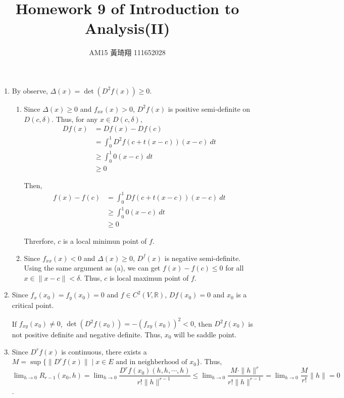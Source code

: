 \documentclass[12pt]{article}
\title{Homework 9 of Introduction to Analysis(II)}
\author{AM15 黃琦翔 111652028}
\begin{document}
\maketitle
\begin{enumerate}
    \item By observe, $\Delta(x) = \det(D^2f(x))\geq 0$.
    \begin{enumerate}
        \item Since $\Delta(x) \geq 0$ and $f_{xx}(x) > 0$, $D^2f(x)$ is positive semi-definite on $D(c, \delta)$.
        Thus, for any $x \in D(c, \delta)$, \begin{align*}
            Df(x) &= Df(x) - Df(c)\\
            &= \int_{0}^{1} D^2f(c+t(x-c))(x-c)\ dt\\
            &\geq \int_{0}^{1} 0(x-c)\ dt\\
            &\geq 0
        \end{align*}
        
        Then, \begin{align*}
            f(x) - f(c) &= \int_{0}^1 Df(c + t(x-c))(x-c)\ dt\\
            &\geq \int_{0}^{1} 0(x-c)\ dt\\
            &\geq 0
        \end{align*}

        Threrfore, $c$ is a local minimun point of $f$. 

        \item Since $f_{xx}(x) < 0$ and $\Delta(x) \geq 0$, $D^f(x)$ is negative semi-definite.
        Using the same argument as (a), we can get $f(x) - f(c) \leq 0$ for all $x\in \| x-c\| < \delta$.
        Thus, $c$ is local maximun point of $f$.

    \end{enumerate}

    \newpage
    \item Since $f_x(x_0) = f_y(x_0) = 0$ and $f \in C^2(V, \mathbb{R})$, $Df(x_0) = 0$ and $x_0$ is a critical point.
    
    If $f_{xy}(x_0)\neq 0$, $\det(D^2f(x_0)) = - (f_{xy}(x_0))^2 < 0$, then $D^2f(x_0)$ is not positive definite and negative definite.
    Thus, $x_0$ will be saddle point.

    \item Since $D^rf(x)$ is continuous, there exists a $M = \sup\{ \| D^rf(x) \| \mid x \in E \text{ and in neighberhood of } x_0\}$.
    Thus, $\displaystyle\lim_{h\to 0} R_{r-1}(x_0, h) = \displaystyle\lim_{h\to 0} \dfrac{D^rf(x_0)(h, h, \cdots, h)}{r!\| h\|^{r-1}} \leq \displaystyle\lim_{h\to 0} \dfrac{M \cdot \| h\|^r}{r!\|h\|^{r-1}} = \displaystyle\lim_{h\to 0} \dfrac{M}{r!}\|h\| =0$.
\end{enumerate}
\end{document}

